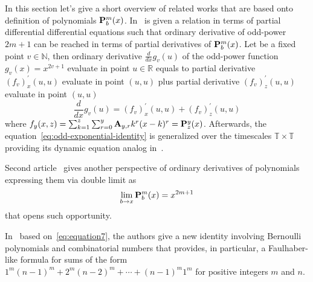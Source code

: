 In this section let's give a short overview of related works that are based onto definition
of polynomials ${\mathbf{P}}\sp{m} \sb{b}(x)$.
In~\cite{kolosov2023another} is given a relation in terms of partial differential differential equations such that
ordinary derivative of odd-power $2m+1$ can be reached in terms of partial derivatives of ${\mathbf{P}}\sp{m} \sb{b}(x)$.
Let be a fixed point $v\in \mathbb{N}$, then ordinary derivative $\frac{d}{dx} g_v (u)$ of the odd-power function $g_v(x) = x^{2v + 1}$
evaluate in point $u\in\mathbb{R}$ equals to partial derivative $(f_{v})^{'}_{x} (u, u)$ evaluate in point $(u, u)$ plus
partial derivative $(f_{v})^{'}_{z} (u, u)$ evaluate in point $(u, u)$
\begin{equation}
    \frac{d}{dx} g_v (u) = (f_{v})^{'}_{x} (u, u) + (f_{v})^{'}_{z} (u, u)
    \label{eq:odd-exponential-identity}
\end{equation}
where $f_{y} (x, z) = \sum_{k=1}^{z} \sum_{r=0}^{y} {\mathbf{A}} \sb{y,r} k^r (x-k)^r = {\mathbf{P}}\sp{y} \sb{z}(x)$.
Afterwards, the equation~\eqref{eq:odd-exponential-identity}
is generalized over the timescales $\mathbb{T} \times \mathbb{T}$ providing its dynamic equation analog
in~\cite{kolosov2016study}.

Second article~\cite{kolosov_2024_10575485} gives another perspective of ordinary derivatives of polynomials expressing
them via double limit as
\[
    \lim_{b \to x} {\mathbf{P}}\sp{m} \sb{b}(x) = x^{2m+1}
\]
that opens such opportunity.

In~\cite{barbero2020two} based on~\eqref{eq:equation7}, the authors give a new identity involving
Bernoulli polynomials and combinatorial numbers that provides,
in particular, a Faulhaber-like formula for sums of the form $1^m(n-1)^m + 2^m (n -2)^m + \cdots + (n - 1)^m 1^m$ for
positive integers $m$ and $n$.
